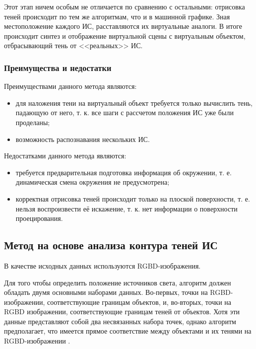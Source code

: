 Этот этап ничем особым не отличается по сравнению с остальными: отрисовка теней происходит по тем же алгоритмам, что и в машинной графике. Зная местоположение каждого ИС, расставляются их виртуальные аналоги. В итоге происходит синтез и отображение виртуальной сцены с виртуальным объектом, отбрасывающий тень от <<реальных>> ИС.

\subsubsection*{Преимущества и недостатки}

Преимуществами данного метода являются: 
\begin{itemize}
	\item для наложения тени на виртуальный объект требуется только вычислить тень, падающую от него, т. к. все шаги с рассчетом положения ИС уже были проделаны;
	\item возможность распознавания нескольких ИС.
\end{itemize}

Недостатками данного метода являются:
\begin{itemize}
	\item требуется предварительная подготовка информация об окружении, т. е. динамическая смена окружения не предусмотрена;
	\item корректная отрисовка теней происходит только на плоской поверхности, т. е. нельзя воспроизвести её искажение, т. к. нет информации о поверхности проецирования.
\end{itemize}

\subsection{Метод на основе анализа контура теней ИС}

В качестве исходных данных используются RGBD-изображения.

Для того чтобы определить положение источников света, алгоритм должен обладать двумя основными наборами данных. Во-первых, точки на RGBD-изображении, соответствующие границам объектов, и, во-вторых, точки на RGBD изображении, соответствующие границам теней от объектов. Хотя эти данные представляют собой два несвязанных набора точек, однако алгоритм предполагает, что имеется прямое соответствие между объектами и их тенями на RGBD-изображении \cite{shadow_contours_method}.

